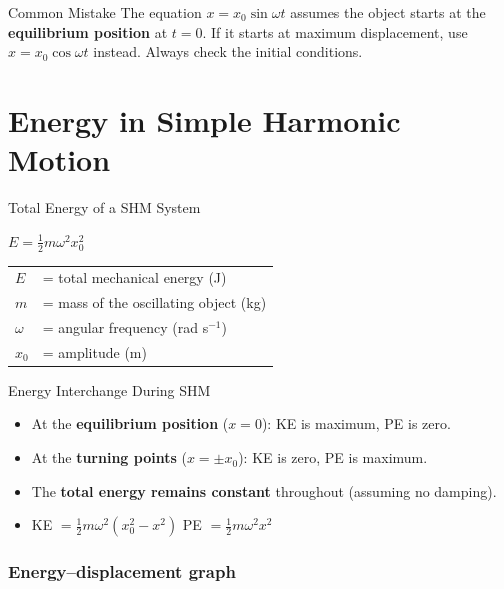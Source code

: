 \begin{warningbox}{Common Mistake}
The equation $x = x_0 \sin\omega t$ assumes the object starts at the \textbf{equilibrium position} at $t = 0$. If it starts at maximum displacement, use $x = x_0 \cos\omega t$ instead. Always check the initial conditions.
\end{warningbox}

\pagebreak

\section{Energy in Simple Harmonic Motion}

\begin{formulabox}{Total Energy of a SHM System}
\begin{center}
\Large $E = \tfrac{1}{2}m\omega^2 x_0^2$
\end{center}
\vspace{0.3em}
\begin{tabular}{@{}ll@{}}
$E$ & = total mechanical energy (J) \\
$m$ & = mass of the oscillating object (kg) \\
$\omega$ & = angular frequency (rad s$^{-1}$) \\
$x_0$ & = amplitude (m) \\
\end{tabular}
\end{formulabox}

\begin{keybox}{Energy Interchange During SHM}
\begin{itemize}[itemsep=2pt]
  \item At the \textbf{equilibrium position} ($x = 0$): KE is maximum, PE is zero.
  \item At the \textbf{turning points} ($x = \pm x_0$): KE is zero, PE is maximum.
  \item The \textbf{total energy remains constant} throughout (assuming no damping).
  \item KE $= \tfrac{1}{2}m\omega^2(x_0^2 - x^2)$ \qquad PE $= \tfrac{1}{2}m\omega^2 x^2$
\end{itemize}
\end{keybox}

\subsubsection*{Energy–displacement graph}

